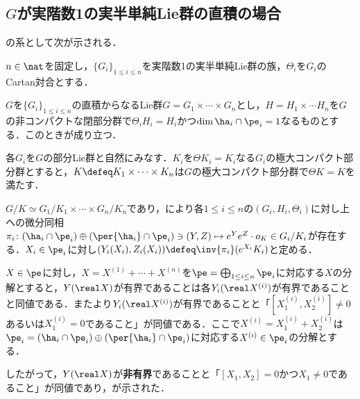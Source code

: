 \subsection{$G$が実階数1の実半単純Lie群の直積の場合}
の系として次が示される．
\begin{cor}\label{cor:0113-main}
  $n\in \nat$を固定し，$\{G_i \}_{1\leq i\leq n} $を実階数1の実半単純Lie群の族，$\Theta_i $を$G_i$のCartan対合とする．
  
  $G$を$\{G_i \}_{1\leq i\leq n} $の直積からなるLie群$G = G_1\times \cdots \times G_n $とし，$H = H_1\times \cdots H_n $を$G$の非コンパクトな閉部分群で$\Theta_i H_i = H_i$かつ$\dim \ha_i \cap\pe_i = 1$なるものとする．このときが成り立つ．
\end{cor}


  
\begin{npfwn}  
  各$G_i $を$G$の部分Lie群と自然にみなす．$K_i$を$\Theta K_i = K_i $なる$G_i$の極大コンパクト部分群とすると，$K \defeq K_1\times \cdots \times K_n $は$G$の極大コンパクト部分群で$\Theta K = K $を満たす．

  $G/K\simeq G_1/K_1\times \cdots \times G_n/K_n $であり，により各$1\leq i\leq n$の$(G_i, H_i, \Theta_i) $に対し上への微分同相$\pi_i\colon  (\ha_i\cap\pe_i)\oplus (\per{\ha_i}\cap \pe_i) \ni (Y, Z)\mapsto e^{Y}e^{Z}\cdot o_K \in G_i/K_i $が存在する．$X_i\in \pe_i $に対し$(Y_i(X_i), Z_i(X_i))\defeq \inv{\pi_i}(e^{X_i}K_i) $と定める．

  $X\in \pe$に対し，$X = X^{(1)} +\cdots + X^{(n)} $を$\pe = \bigoplus_{1\leq i\leq n}\pe_i $に対応する$X$の分解とすると，$Y(\real X) $が有界であることは各$Y_i(\real X^{(i)}) $が有界であることと同値である．またより$Y_i(\real X^{(i)}) $が有界であることと「$[X_1^{(i)}, X_2^{(i)} ] \neq 0 $あるいは$X^{(i)}_1 = 0 $であること」が同値である．ここで$X^{(i)} =  X_1^{(i)} + X_2^{(i)}$は$\pe_i = (\ha_i\cap\pe_i)\oplus (\per{\ha_i}\cap\pe_i) $に対応する$X^{(i)}\in \pe_i $の分解とする．

  したがって，$Y(\real X) $が\textbf{非有界}であることと「$[X_1, X_2] = 0 $かつ$X_1 \neq 0 $であること」が同値であり，が示された．  
\end{npfwn}
